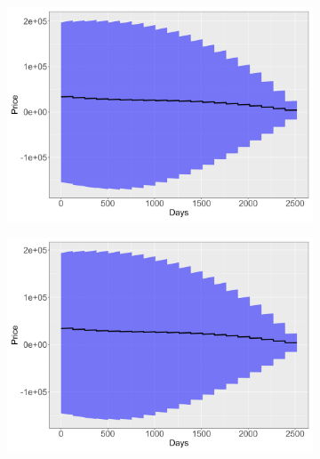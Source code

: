 \begin{figure}[!htbp]
    \centering
    \captionsetup{type=figure}
    \begin{subfigure}{0.49\textwidth}
        \centering
        \captionsetup{justification=centering}
        \includegraphics[width=\textwidth]{Figures/Prices/procedure_1_poly_model_prices_plot.png}
        \label{fig:irs of procedure 1, poly.}
    \end{subfigure}
    \hfill
    \begin{subfigure}{0.49\textwidth}
        \centering
        \captionsetup{justification=centering}
        \includegraphics[width=\textwidth]{Figures/Prices/procedure_1_spline_model_prices_plot.png}
        \label{fig:irs of procedure 1, spline.}

\end{subfigure}
\end{figure}
